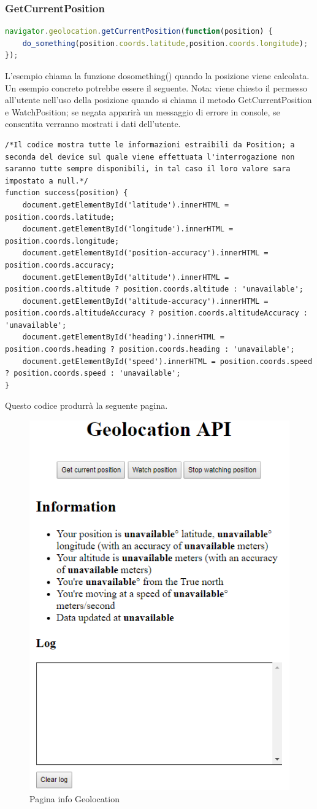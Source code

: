 \documentclass[11pt ,a4paper , twoside , openright ]{article}
\begin{document}
\subsubsection{GetCurrentPosition}
\begin{lstlisting}[language=JavaScript]
navigator.geolocation.getCurrentPosition(function(position) {
	do_something(position.coords.latitude,position.coords.longitude);
});
\end{lstlisting}
L'esempio chiama la funzione dosomething() quando la posizione viene calcolata. 
\\
Un esempio concreto potrebbe essere il seguente. 
Nota: viene chiesto il permesso all'utente nell'uso della posizione quando si chiama il metodo GetCurrentPosition e WatchPosition; se negata apparirà un messaggio di errore in console, se consentita verranno mostrati i dati dell'utente.
\\
\begin{lstlisting}
/*Il codice mostra tutte le informazioni estraibili da Position; a seconda del device sul quale viene effettuata l'interrogazione non saranno tutte sempre disponibili, in tal caso il loro valore sara impostato a null.*/
function success(position) {
	document.getElementById('latitude').innerHTML = position.coords.latitude;
	document.getElementById('longitude').innerHTML = position.coords.longitude;
	document.getElementById('position-accuracy').innerHTML = position.coords.accuracy;	
	document.getElementById('altitude').innerHTML = position.coords.altitude ? position.coords.altitude : 'unavailable';
	document.getElementById('altitude-accuracy').innerHTML = position.coords.altitudeAccuracy ? position.coords.altitudeAccuracy : 'unavailable';
	document.getElementById('heading').innerHTML = position.coords.heading ? position.coords.heading : 'unavailable';
	document.getElementById('speed').innerHTML = position.coords.speed ? position.coords.speed : 'unavailable';
}
\end{lstlisting}
Questo codice produrrà la seguente pagina.
\begin{figure}[h]
	\centering
	\includegraphics[width=0.5\linewidth]{geo1}
	\caption{Pagina info Geolocation}
	\label{fig: Pagina info Geolocation}
\end{figure}
\end{document}
